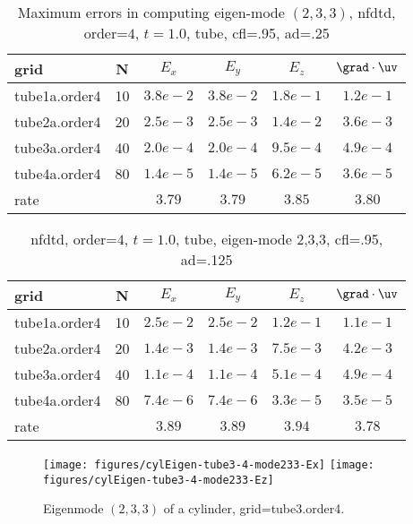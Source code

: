 \begin{table}[hbt]
\begin{center}
\begin{tabular}{|l|c|c|c|c|c|} \hline\hline 
grid  & N &  $E_x$ &  $E_y$ & $E_z$ & $\grad\cdot\uv$\\ \hline 
       tube1a.order4 &    10 &$3.8 e-2$ &$3.8 e-2$ &$1.8 e-1$ &$1.2 e-1$  \\ \hline
       tube2a.order4 &    20 &$2.5 e-3$ &$2.5 e-3$ &$1.4 e-2$ &$3.6 e-3$  \\ \hline
       tube3a.order4 &    40 &$2.0 e-4$ &$2.0 e-4$ &$9.5 e-4$ &$4.9 e-4$  \\ \hline
       tube4a.order4 &    80 &$1.4 e-5$ &$1.4 e-5$ &$6.2 e-5$ &$3.6 e-5$  \\ \hline
    rate            &     &       $3.79$ &       $3.79$ &       $3.85$ &       $3.80$  \\ \hline\hline
\end{tabular}
\caption{Maximum errors in computing eigen-mode $(2,3,3)$,
          nfdtd, order=$4$, $t=1.0$, tube,  cfl=.95, ad=.25 }\label{table:mx.tube}
\end{center}
\end{table}

\begin{table}[hbt]
\begin{center}
\begin{tabular}{|l|c|c|c|c|c|} \hline\hline 
grid  & N &  $E_x$ &  $E_y$ & $E_z$ & $\grad\cdot\uv$\\ \hline 
       tube1a.order4 &    10 &$2.5 e-2$ &$2.5 e-2$ &$1.2 e-1$ &$1.1 e-1$  \\ \hline
       tube2a.order4 &    20 &$1.4 e-3$ &$1.4 e-3$ &$7.5 e-3$ &$4.2 e-3$  \\ \hline
       tube3a.order4 &    40 &$1.1 e-4$ &$1.1 e-4$ &$5.1 e-4$ &$4.9 e-4$  \\ \hline
       tube4a.order4 &    80 &$7.4 e-6$ &$7.4 e-6$ &$3.3 e-5$ &$3.5 e-5$  \\ \hline
    rate            &     &       $3.89$ &       $3.89$ &       $3.94$ &       $3.78$  \\ \hline\hline
\end{tabular}
\caption{nfdtd, order=$4$, $t=1.0$, tube, eigen-mode 2,3,3, cfl=.95, ad=.125}\label{table:mx.tube}
\end{center}
\end{table}

\renewcommand{\figWidth}{.45\linewidth}
\begin{figure}
\begin{center}
\texttt{[image: figures/cylEigen-tube3-4-mode233-Ex]}
\texttt{[image: figures/cylEigen-tube3-4-mode233-Ez]}
\end{center}
\caption{Eigenmode $(2,3,3)$ of a cylinder, grid=tube3.order4.}
\end{figure}


